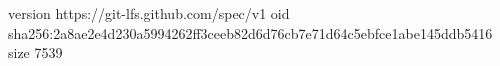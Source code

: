 version https://git-lfs.github.com/spec/v1
oid sha256:2a8ae2e4d230a5994262ff3ceeb82d6d76cb7e71d64c5ebfce1abe145ddb5416
size 7539
